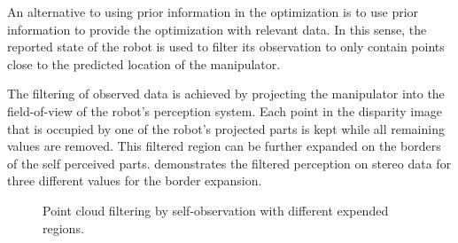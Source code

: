 An alternative to using prior information in the optimization is to use prior information to provide the optimization with relevant data. In this sense, the reported state of the robot is used to filter its observation to only contain points close to the predicted location of the manipulator.

The filtering of observed data is achieved by projecting the manipulator into the field-of-view of the robot's perception system. Each point in the disparity image that is occupied by one of the robot's projected parts is kept while all remaining values are removed. This filtered region can be further expanded on the borders of the self perceived parts.  demonstrates the filtered perception on stereo data for three different values for the border expansion.

\begin{figure}[h]
\centering
{}
\caption[Self-Observation filtering]{Point cloud filtering by self-observation with different expended regions.}
\label{fig:self_observation_region}
\end{figure}

